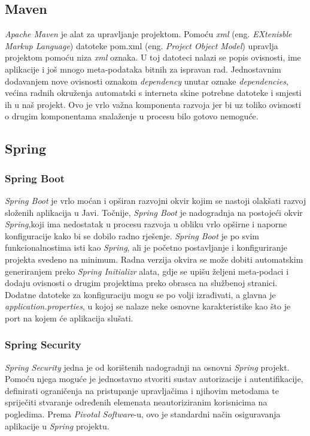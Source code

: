 \documentclass[zavrsni, numeric]{fer}
\begin{document}
\subsection{Maven}

\textit{Apache Maven}\citep{apache-maven} je alat za upravljanje projektom. Pomoću \textit{xml} (eng. \textit{EXtenisble Markup Language}) datoteke pom.xml (eng. \textit{Project Object Model}) upravlja projektom pomoću niza \textit{xml} oznaka. U toj datoteci nalazi se popis ovisnosti, ime aplikacije i još mnogo meta-podataka bitnih za ispravan rad. Jednostavnim dodavanjem nove ovisnosti oznakom \textit{dependency} unutar oznake \textit{dependencies}, većina radnih okruženja automatski s interneta skine potrebne datoteke i smjesti ih u naš projekt. Ovo je vrlo važna komponenta razvoja jer bi uz toliko ovisnosti o drugim komponentama snalaženje u procesu bilo gotovo nemoguće.

\subsection{Spring}

\subsubsection{Spring Boot}
\textit{Spring Boot}\citep{spring-boot} je vrlo moćan i opširan razvojni okvir kojim se nastoji olakšati razvoj složenih aplikacija u Javi. Točnije, \textit{Spring Boot} je nadogradnja na postojeći okvir \textit{Spring},koji ima nedostatak u procesu razvoja u obliku vrlo opširne i naporne konfiguracije kako bi se dobilo radno rješenje. \textit{Spring Boot} je po svim funkcionalnostima isti kao \textit{Spring}, ali je početno postavljanje i konfiguriranje projekta svedeno na minimum. Radna verzija okvira se može dobiti automatskim generiranjem preko \textit{Spring Initializr}\citep{spring-initializr} alata, gdje se upišu željeni meta-podaci i dodaju ovisnosti o drugim projektima preko obrasca na službenoj stranici. Dodatne datoteke za konfiguraciju mogu se po volji izrađivati, a glavna je \textit{application.properties}, u kojoj se nalaze neke osnovne karakteristike kao što je port na kojem će aplikacija slušati.

\subsubsection{Spring Security}
\textit{Spring Security}\citep{spring-security} jedna je od korištenih nadogradnji na osnovni \textit{Spring} projekt. Pomoću njega moguće je jednostavno stvoriti sustav autorizacije i autentifikacije, definirati ograničenja na pristupanje upravljačima i njihovim metodama te spriječiti stvaranje određenih elemenata neautoriziranim korisnicima na pogledima. Prema \textit{Pivotal Software}-u, ovo je standardni način osiguravanja aplikacije u \textit{Spring} projektu.
\end{document}
